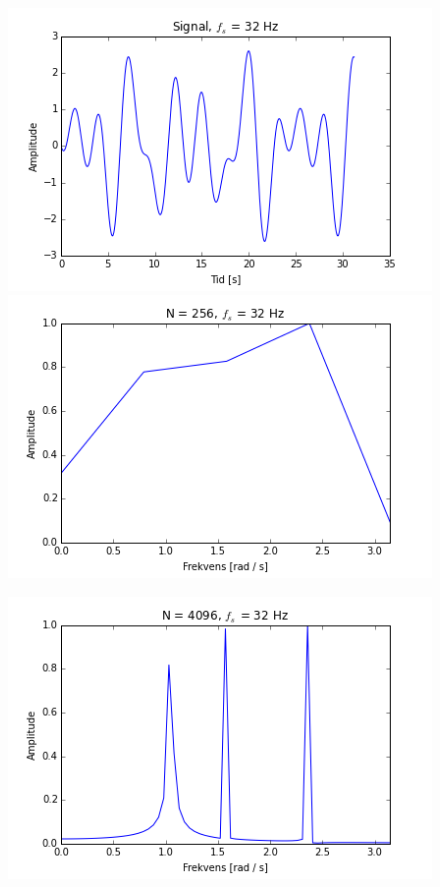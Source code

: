 \begin{figure}[H]
\begin{minipage}{0.49\textwidth}
\includegraphics[width=\textwidth]{figures/signal_32hz.png}
\includegraphics[width=\textwidth]{figures/frekvensanalyse/freq_32hz_N256}
\end{minipage}
\begin{minipage}{0.49\textwidth}
\includegraphics[width=\textwidth]{figures/frekvensanalyse/freq_32hz_N4096.png}

\end{minipage}
\end{figure}
